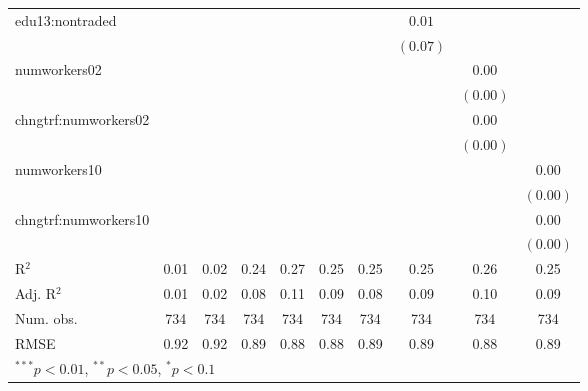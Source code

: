 \begin{table}
\begin{center}
\begin{tabular}{l c c c c c c c c c }
edu13:nontraded      &              &               &              &               &              &              & $0.01$       &               &              \\
                     &              &               &              &               &              &              & $(0.07)$     &               &              \\
numworkers02         &              &               &              &               &              &              &              & $0.00$        &              \\
                     &              &               &              &               &              &              &              & $(0.00)$      &              \\
chngtrf:numworkers02 &              &               &              &               &              &              &              & $0.00$        &              \\
                     &              &               &              &               &              &              &              & $(0.00)$      &              \\
numworkers10         &              &               &              &               &              &              &              &               & $0.00$       \\
                     &              &               &              &               &              &              &              &               & $(0.00)$     \\
chngtrf:numworkers10 &              &               &              &               &              &              &              &               & $0.00$       \\
                     &              &               &              &               &              &              &              &               & $(0.00)$     \\
\hline
R$^2$                & 0.01         & 0.02          & 0.24         & 0.27          & 0.25         & 0.25         & 0.25         & 0.26          & 0.25         \\
Adj. R$^2$           & 0.01         & 0.02          & 0.08         & 0.11          & 0.09         & 0.08         & 0.09         & 0.10          & 0.09         \\
Num. obs.            & 734          & 734           & 734          & 734           & 734          & 734          & 734          & 734           & 734          \\
RMSE                 & 0.92         & 0.92          & 0.89         & 0.88          & 0.88         & 0.89         & 0.89         & 0.88          & 0.89         \\
\hline
\multicolumn{10}{l}{\scriptsize{$^{***}p<0.01$, $^{**}p<0.05$, $^*p<0.1$}}
\end{tabular}
\label{table:coefficients}
\end{center}
\end{table}
